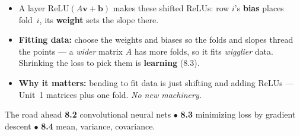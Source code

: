 \documentclass[aspectratio=169, 11pt]{beamer}
\newcommand{\vv}{\mathbf{v}}
\newcommand{\bb}{\mathbf{b}}
\newcommand{\relu}{\mathrm{ReLU}}
\begin{document}
\begin{frame}[t, plain]
  \begin{itemize}
    \setlength{\itemsep}{6pt}
    \item A layer $\relu(A\vv+\bb)$ makes these shifted ReLUs: row $i$'s \textbf{bias} places fold~$i$, its
          \textbf{weight} sets the slope there.
    \item \textbf{Fitting data:} choose the weights and biases so the folds and slopes thread the points --- a
          \emph{wider} matrix $A$ has more folds, so it fits \emph{wigglier} data. Shrinking the loss to pick
          them is \textbf{learning} (8.3).
    \item \textbf{Why it matters:} bending to fit data is just shifting and adding ReLUs --- Unit~1 matrices
          plus one fold. \emph{No new machinery.}
  \end{itemize}
  \vspace{2pt}
  \begin{block}{The road ahead}
    \textbf{8.2} convolutional neural nets \;$\bullet$\; \textbf{8.3} minimizing loss by gradient descent
    \;$\bullet$\; \textbf{8.4} mean, variance, covariance.
  \end{block}
\end{frame}
\end{document}
